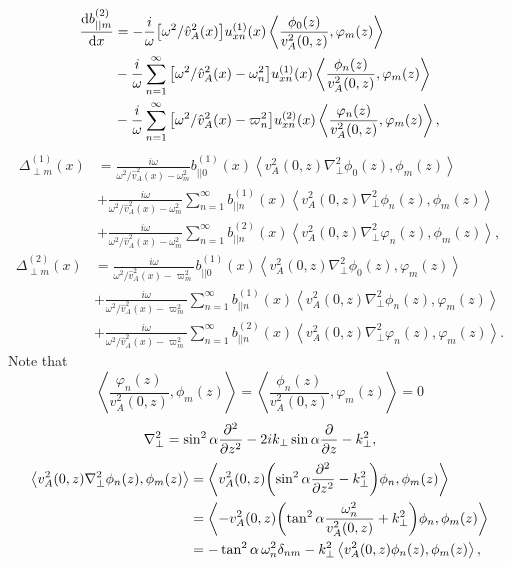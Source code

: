 \documentclass{article}
\begin{document}
\[\begin{aligned}
\dv{b_{||m}^{(2)}}{x}&=-\frac{i}{\omega}\qty[\omega^2/\hat{v}_A^2(x)]u_{xn}^{(1)}(x)\left\langle\frac{\phi_0(z)}{v_A^2(0,z)},\varphi_m(z)\right\rangle \\
&-\frac{i}{\omega}\sum_{n=1}^\infty\qty[\omega^2/\hat{v}_A^2(x) - \omega_n^2]u_{xn}^{(1)}(x)\left\langle\frac{\phi_n(z)}{v_A^2(0,z)},\varphi_m(z)\right\rangle \\
&-\frac{i}{\omega}\sum_{n=1}^\infty\qty[\omega^2/\hat{v}_A^2(x) - \varpi_n^2]u_{xn}^{(2)}(x)\left\langle\frac{\varphi_n(z)}{v_A^2(0,z)},\varphi_m(z)\right\rangle,
\end{aligned}\]
\[\begin{aligned}
\Delta_{\perp m}^{(1)}(x)&=\frac{i\omega }{\omega^2/\hat{v}_{A}^2(x)-\omega_m^2}b_{||0}^{(1)}(x)\left\langle v_A^2(0,z)\nabla_\perp^2\phi_0(z),\phi_m(z)\right\rangle \\
&+\frac{i\omega }{\omega^2/\hat{v}_{A}^2(x)-\omega_m^2}\sum_{n=1}^\infty b_{||n}^{(1)}(x)\left\langle v_A^2(0,z)\nabla_\perp^2\phi_n(z),\phi_m(z)\right\rangle \\
&+\frac{i\omega }{\omega^2/\hat{v}_{A}^2(x)-\omega_m^2}\sum_{n=1}^\infty b_{||n}^{(2)}(x)\left\langle v_A^2(0,z)\nabla_\perp^2\varphi_n(z),\phi_m(z)\right\rangle,
\end{aligned}\]
\[\begin{aligned}
\Delta_{\perp m}^{(2)}(x)&=\frac{i\omega }{\omega^2/\hat{v}_{A}^2(x)-\varpi_m^2}b_{||0}^{(1)}(x)\left\langle v_A^2(0,z)\nabla_\perp^2\phi_0(z),\varphi_m(z)\right\rangle \\
&+\frac{i\omega }{\omega^2/\hat{v}_{A}^2(x)-\varpi_m^2}\sum_{n=1}^\infty b_{||n}^{(1)}(x)\left\langle v_A^2(0,z)\nabla_\perp^2\phi_n(z),\varphi_m(z)\right\rangle \\
&+\frac{i\omega }{\omega^2/\hat{v}_{A}^2(x)-\varpi_m^2}\sum_{n=1}^\infty b_{||n}^{(2)}(x)\left\langle v_A^2(0,z)\nabla_\perp^2\varphi_n(z),\varphi_m(z)\right\rangle.
\end{aligned}\]
Note that
\[\left\langle\frac{\varphi_n(z)}{v_A^2(0,z)},\phi_m(z)\right\rangle=\left\langle\frac{\phi_n(z)}{v_A^2(0,z)},\varphi_m(z)\right\rangle=0\]
\[\nabla_\perp^2 = \sin^2\alpha\pdv[2]{}{z}-2ik_\perp\sin\alpha\pdv{}{z}-k_\perp^2,\]
\[\begin{aligned}
\left\langle v_A^2(0,z)\nabla_\perp^2\phi_n(z),\phi_m(z)\right\rangle&=\left\langle v_A^2(0,z)\qty(\sin^2\alpha\pdv[2]{}{z}-k_\perp^2)\phi_n,\phi_m(z)\right\rangle\\
&=\left\langle -v_A^2(0,z)\qty(\tan^2\alpha\frac{\omega_n^2}{v_A^2(0,z)}+k_\perp^2)\phi_n,\phi_m(z)\right\rangle \\
&=-\tan^2\alpha\,\omega_n^2\delta_{nm}-k_\perp^2\left\langle v_A^2(0,z)\phi_n(z),\phi_m(z)\right\rangle,
\end{aligned}\]
\end{document}
